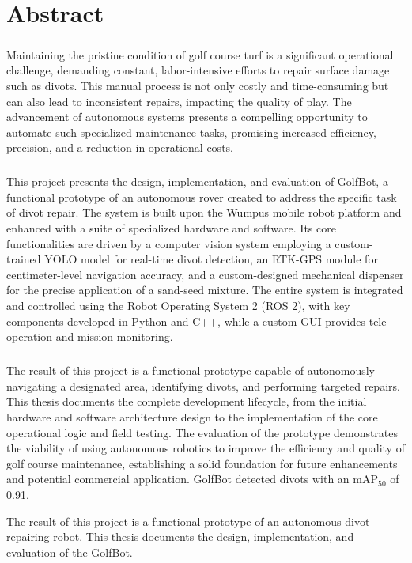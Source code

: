 \chapter*{Abstract}


    \paragraph{} 
    Maintaining the pristine condition of golf course turf is a significant operational challenge, demanding constant, labor-intensive efforts to repair surface damage such as divots. This manual process is not only costly and time-consuming but can also lead to inconsistent repairs, impacting the quality of play. The advancement of autonomous systems presents a compelling opportunity to automate such specialized maintenance tasks, promising increased efficiency, precision, and a reduction in operational costs.
    
    \paragraph{}
    This project presents the design, implementation, and evaluation of GolfBot, a functional prototype of an autonomous rover created to address the specific task of divot repair. The system is built upon the Wumpus mobile robot platform and enhanced with a suite of specialized hardware and software. Its core functionalities are driven by a computer vision system employing a custom-trained YOLO model for real-time divot detection, an RTK-GPS module for centimeter-level navigation accuracy, and a custom-designed mechanical dispenser for the precise application of a sand-seed mixture. The entire system is integrated and controlled using the Robot Operating System 2 (ROS 2), with key components developed in Python and C++, while a custom GUI provides tele-operation and mission monitoring.

    \paragraph{} 
    The result of this project is a functional prototype capable of autonomously navigating a designated area, identifying divots, and performing targeted repairs. This thesis documents the complete development lifecycle, from the initial hardware and software architecture design to the implementation of the core operational logic and field testing. The evaluation of the prototype demonstrates the viability of using autonomous robotics to improve the efficiency and quality of golf course maintenance, establishing a solid foundation for future enhancements and potential commercial application. GolfBot detected divots with an mAP$_{50}$ of 0.91. 
     

The result of this project is a functional prototype of an autonomous divot-repairing robot. This thesis documents the design, implementation, and evaluation of the GolfBot.
